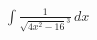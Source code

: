 \documentclass[preview]{standalone}
\begin{document}
\begin{align*}
\int \frac{1}{\sqrt{4x^2-16}^3} \, dx
\end{align*}
\end{document}
